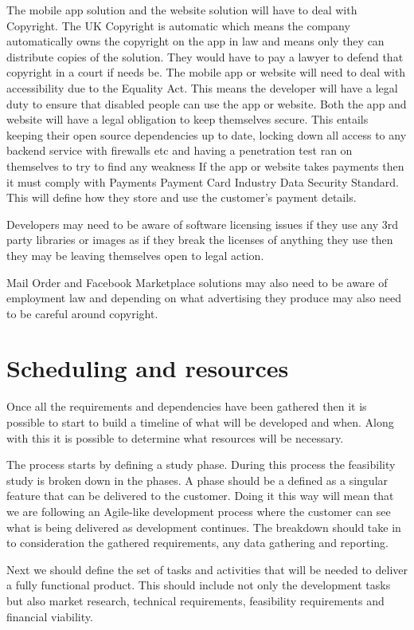 \documentclass{article}
\begin{document}
The mobile app solution and the website solution will have to deal with Copyright. The UK Copyright is automatic which means the company automatically owns the copyright on the app in law and means only they can distribute copies of the solution. They would have to pay a lawyer to defend that copyright in a court if needs be.
The mobile app or website will need to deal with accessibility due to the Equality Act. This means the developer will have a legal duty to ensure that disabled people can use the app or website.
Both the app and website will have a legal obligation to keep themselves secure. This entails keeping their open source dependencies up to date, locking down all access to any backend service with firewalls etc and having a penetration test ran on themselves to try to find any weakness 
If the app or website takes payments then it must comply with Payments Payment Card Industry Data Security Standard. This will define how they store and use the customer's payment details.

Developers may need to be aware of software licensing issues if they use any 3rd party libraries or images as if they break the licenses of anything they use then they may be leaving themselves open to legal action.

Mail Order and Facebook Marketplace solutions may also need to be aware of employment law and depending on what advertising they produce may also need to be careful around copyright. 

\pagebreak
\section{Scheduling and resources}
Once all the requirements and dependencies have been gathered then it is possible to start to build a timeline of what will be developed and when. Along with this it is possible to determine what resources will be necessary.

The process starts by defining a study phase. During this process the feasibility study is broken down in the phases. A phase should be a defined as a singular feature that can be delivered to the customer. Doing it this way will mean that we are following an Agile-like development process where the customer can see what is being delivered as development continues.
The breakdown should take in to consideration the gathered requirements, any data gathering and reporting.

Next we should define the set of tasks and activities that will be needed to deliver a fully functional product. This should include not only the development tasks but also market research, technical requirements, feasibility requirements and financial viability.
\end{document}
